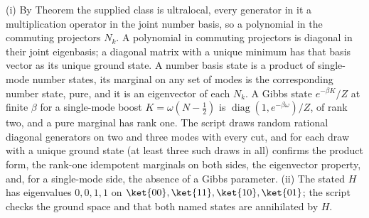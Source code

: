 (i) By Theorem  the supplied class is ultralocal, every generator in it a multiplication operator in the joint number basis, so a polynomial in the commuting projectors $N_{k}$. A polynomial in commuting projectors is diagonal in their joint eigenbasis; a diagonal matrix with a unique minimum has that basis vector as its unique ground state. A number basis state is a product of single-mode number states, its marginal on any set of modes is the corresponding number state, pure, and it is an eigenvector of each $N_{k}$. A Gibbs state $e^{-\beta K}/Z$ at finite $\beta$ for a single-mode boost $K = \omega(N - \tfrac12)$ is $\operatorname{diag}(1, e^{-\beta\omega})/Z$, of rank two, and a pure marginal has rank one. The script draws random rational diagonal generators on two and three modes with every cut, and for each draw with a unique ground state (at least three such draws in all) confirms the product form, the rank-one idempotent marginals on both sides, the eigenvector property, and, for a single-mode side, the absence of a Gibbs parameter. (ii) The stated $H$ has eigenvalues $0, 0, 1, 1$ on $\ket{00}, \ket{11}, \ket{10}, \ket{01}$; the script checks the ground space and that both named states are annihilated by $H$.
